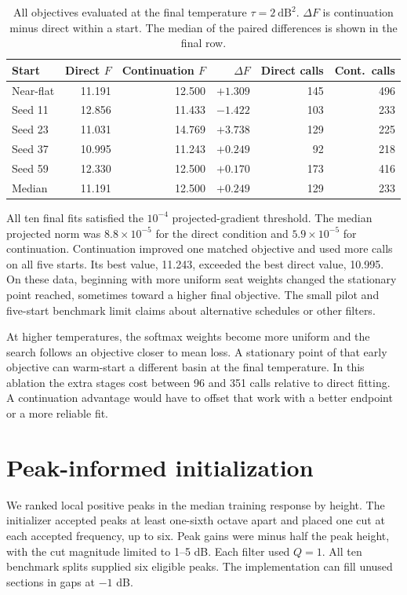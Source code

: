 \documentclass[11pt,letterpaper]{article}
\newcommand{\loss}{\mathrm{dB}^2}
\begin{document}
\begin{table}[h!]
\centering
\small
\begin{tabular}{lrrrrr}
\toprule
Start & Direct $F$ & Continuation $F$ & $\Delta F$ & Direct calls & Cont.\ calls \\
\midrule
Near-flat & 11.191 & 12.500 & $+1.309$ & 145 & 496 \\
Seed 11   & 12.856 & 11.433 & $-1.422$ & 103 & 233 \\
Seed 23   & 11.031 & 14.769 & $+3.738$ & 129 & 225 \\
Seed 37   & 10.995 & 11.243 & $+0.249$ & 92  & 218 \\
Seed 59   & 12.330 & 12.500 & $+0.170$ & 173 & 416 \\
\midrule
Median    & 11.191 & 12.500 & $+0.249$ & 129 & 233 \\
\bottomrule
\end{tabular}
\caption{All objectives evaluated at the final temperature
$\tau=2~\loss$. $\Delta F$ is continuation minus direct within a start.
The median of the paired differences is shown in the final row.}
\end{table}

All ten final fits satisfied the $10^{-4}$ projected-gradient threshold.
The median projected norm was $8.8\times10^{-5}$ for the direct
condition and $5.9\times10^{-5}$ for continuation. Continuation improved
one matched objective and used more calls on all five starts.
Its best value, 11.243, exceeded the best direct value, 10.995.
On these data, beginning with more uniform seat weights changed the
stationary point reached, sometimes toward a higher final objective.
The small pilot and five-start benchmark limit claims about alternative
schedules or other filters.

At higher temperatures, the softmax weights become more uniform and
the search follows an objective closer to mean loss. A stationary point
of that early objective can warm-start a different basin at the final
temperature. In this ablation the extra stages cost between 96 and 351
calls relative to direct fitting. A continuation advantage would have to
offset that work with a better endpoint or a more reliable fit.

\clearpage
\section{Peak-informed initialization}
We ranked local positive peaks in the median training response by height.
The initializer accepted peaks at least one-sixth octave apart and placed
one cut at each accepted frequency, up to six. Peak gains were minus half
the peak height, with the cut magnitude limited to 1--5 dB. Each filter used
$Q=1$. All ten benchmark splits supplied six eligible peaks. The
implementation can fill unused sections in gaps at $-1$ dB.
\end{document}
